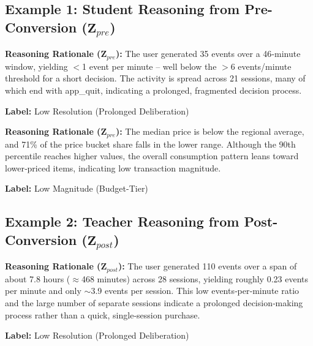 \subsection{Example 1: Student Reasoning from Pre-Conversion ($\mathbf{Z}_{pre}$)}

\begin{tcolorbox}[colback=gray!10, colframe=gray!50, title=Dimension 1: Temporal Resolution]
\small
\textbf{Reasoning Rationale ($\mathbf{Z}_{pre}$):} The user generated 35 events over a 46‑minute window, yielding $<$1 event per minute – well below the $>$6 events/minute threshold for a short decision. The activity is spread across 21 sessions, many of which end with app\_quit, indicating a prolonged, fragmented decision process.

\textbf{Label:} Low Resolution (Prolonged Deliberation)
\end{tcolorbox}

\begin{tcolorbox}[colback=gray!10, colframe=gray!50, title=Dimension 2: Transaction Magnitude]
\small
\textbf{Reasoning Rationale ($\mathbf{Z}_{pre}$):} The median price is below the regional average, and 71\% of the price bucket share falls in the lower range. Although the 90th percentile reaches higher values, the overall consumption pattern leans toward lower‑priced items, indicating low transaction magnitude.

\textbf{Label:} Low Magnitude (Budget-Tier)
\end{tcolorbox}

\subsection{Example 2: Teacher Reasoning from Post-Conversion ($\mathbf{Z}_{post}$)}

\begin{tcolorbox}[colback=gray!10, colframe=gray!50, title=Dimension 1: Temporal Resolution]
\small
\textbf{Reasoning Rationale ($\mathbf{Z}_{post}$):} The user generated 110 events over a span of about 7.8 hours ($\approx$468 minutes) across 28 sessions, yielding roughly 0.23 events per minute and only $\sim$3.9 events per session. This low events‑per‑minute ratio and the large number of separate sessions indicate a prolonged decision‑making process rather than a quick, single‑session purchase.

\textbf{Label:} Low Resolution (Prolonged Deliberation)
\end{tcolorbox}

